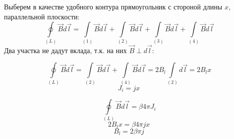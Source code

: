 \documentclass[a4paper,14pt]{extarticle}
\begin{document}
Выберем в качестве удобного контура прямоугольник с стороной длины $x$, параллельной плоскости:
\begin{equation}
    \oint\limits_{(L)} \vec{B}d\vec{l}= 
    \int\limits_{(1)} \vec{B}d\vec{l}+
    \int\limits_{(2)} \vec{B}d\vec{l}+
    \int\limits_{(3)} \vec{B}d\vec{l}+
    \int\limits_{(4)} \vec{B}d\vec{l}
\end{equation}
Два участка не дадут вклада, т.к. на них $\vec{B}\perp d \vec{l}$:

\begin{equation}
    \oint\limits_{(L)} \vec{B}d\vec{l}= 
    \int\limits_{(2)} \vec{B}d\vec{l}+
    \int\limits_{(4)} \vec{B}d\vec{l}=
    2B_l\int\limits_{(2)} d\vec{l}=2B_l x
\end{equation}
\begin{equation}
    J_i=jx
\end{equation}

\begin{equation}
    \oint\limits_{(L)} \vec{B}d\vec{l}=
    \beta 4\pi J_i
\end{equation}
\begin{equation}
    2B_l x=\beta 4\pi j x
\end{equation}
\begin{equation}
    B_l=2\beta\pi j
\end{equation}
\end{document}
